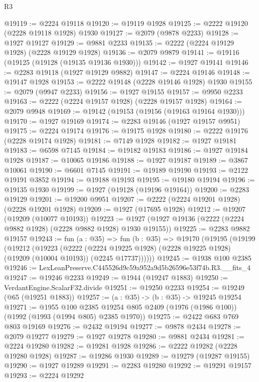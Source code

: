 \begin{lexlean}{R3}
\begin{coremodule}
@19119 := @2224 @19118
@19120 := @19119 @1928
@19125 := @2222 @19120 (@2228 @19118 @1928) @1930
@19127 := @2079 (@9878 @2233)
@19128 := @1927 @19127
@19129 := @9881 @2233
@19135 := @2222 (@2224 @19129 @1928) (@2228 @19129 @1928)
@19136 := @2079 @9879
@19141 := @19116 (@19125 (@19128 (@19135 @19136 @1930)))
@19142 := @1927 @19141
@19146 := @2283 @19118 (@1927 @19129 @9882)
@19147 := @2224 @19146
@19148 := @19147 @1928
@19153 := @2222 @19148 (@2228 @19146 @1928) @1930
@19155 := @2079 (@9947 @2233)
@19156 := @1927 @19155
@19157 := @9950 @2233
@19163 := @2222 (@2224 @19157 @1928) (@2228 @19157 @1928)
@19164 := @2079 @9948
@19169 := @19142 (@19153 (@19156 (@19163 @19164 @1930)))
@19170 := @1927 @19169
@19174 := @2283 @19146 (@1927 @19157 @9951)
@19175 := @2224 @19174
@19176 := @19175 @1928
@19180 := @2222 @19176 (@2228 @19174 @1928)
@19181 := @7149 @1928
@19182 := @1927 @19181
@19183 := @6598 @7145
@19184 := @19182 @19183
@19186 := @1927 @19184 @1928
@19187 := @10065 @19186
@19188 := @1927 @19187
@19189 := @3867 @10061
@19190 := @6601 @7145
@19191 := @19189 @19190
@19193 := @2122 @19191 @3852
@19194 := @19188 @19193
@19195 := @19180 @19194
@19196 := @19135 @1930
@19199 := @1927 (@19128 (@19196 @19164))
@19200 := @2283 @19129
@19201 := @19200 @9951
@19207 := @2222 (@2224 @19201 @1928) (@2228 @19201 @1928)
@19209 := @1927 (@17695 @1928)
@19212 := @19207 (@19209 (@10077 @10193))
@19223 := @1927 (@1927 @19136 (@2222 (@2224 @9882 @1928) (@2228 @9882 @1928) @1930 @19155))
@19225 := @2283 @9882 @19157
@19243 := fun (a : @35) =>
  fun (b : @35) =>
  @19170
    (@19195
      (@19199
        (@19212
          (@19223
            (@2222
              (@2224 @19225 @1928)
              (@2228 @19225 @1928)
              (@19209 (@10004 @10193))
              (@2245 @17737))))))
@19245 := @1938 @100 @2385
@19246 := LexLeanPreserve.C445526d9c59a952a9d5b26596e53f74b.R3.__fits_4
@19247 := @19246 @2233
@19249 := @1944 (@19247 @1883)
@19250 := VerdantEngine.ScalarF32.divide
@19251 := @19250 @2233
@19254 := @19249 (@65 (@19251 @1883))
@19257 := (a : @35) -> (b : @35) -> @19245 @19254
@19271 := @1955
    @100
    @2385
    @19254
    @805
    @2409
    (@1976 (@1986 @100))
    (@1992 (@1993 (@1994 @805) @2385 @1970))
@19275 := @2422 @683 @769 @803 @19169
@19276 := @2432 @19194
@19277 := @9878 @2434
@19278 := @2079 @19277
@19279 := @1927 @19278
@19280 := @9881 @2434
@19281 := @2224 @19280
@19282 := @19281 @1928
@19286 := @2222 @19282 (@2228 @19280 @1928)
@19287 := @19286 @1930
@19289 := @19279 (@19287 @19155)
@19290 := @1927 @19289
@19291 := @2283 @19280
@19292 := @19291 @19157
@19293 := @2224 @19292

\end{coremodule}
\end{lexlean}
